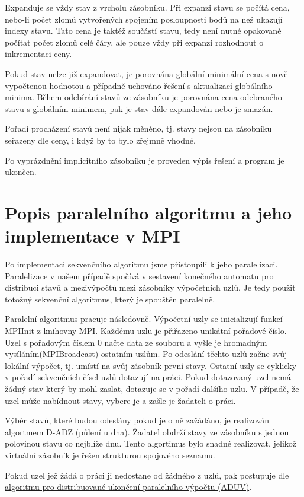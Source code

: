 \documentclass[12pt]{article}
\begin{document}
Expanduje se vždy stav z vrcholu zásobníku. Při expanzi stavu se počítá cena, nebo-li počet zlomů vytvořených spojením posloupnosti bodů na než ukazují indexy stavu. Tato cena je taktéž součástí stavu, tedy není nutné opakovaně počítat počet zlomů celé čáry, ale pouze vždy při expanzi rozhodnout o inkrementaci ceny.

Pokud stav nelze již expandovat, je porovnána globální minimální cena s nově vypočtenou hodnotou a případně uchováno řešení s aktualizací globálního minima. Během odebírání stavů ze zásobníku je porovnána cena odebraného stavu s globálním minimem, pak je stav dále expandován nebo je smazán.

Pořadí procházení stavů není nijak měněno, tj. stavy nejsou na zásobníku seřazeny dle ceny, i když by to bylo zřejmně vhodné.

Po vyprázdnění implicitního zásobníku je proveden výpis řešení a program je ukončen.


\section{Popis paralelního algoritmu a jeho implementace v MPI}

Po implementaci sekvenčního algoritmu jsme přistoupili k jeho paralelizaci. Paralelizace v našem případě spočívá v sestavení  konečného automatu pro distribuci stavů a mezivýpočtů mezi zásobníky výpočetních uzlů. Je tedy použit totožný sekvenční algoritmus, který je spouštěn paralelně.

Paralelní algoritmus pracuje následovně. Výpočetní uzly se inicializují funkcí MPIInit z knihovny MPI. Každému uzlu je přiřazeno unikátní pořadové číslo. Uzel s pořadovým číslem 0 načte data ze souboru a vyšle je hromadným vysíláním(MPIBroadcast) ostatním uzlům. Po odeslání těchto uzlů začne svůj lokální výpočet, tj. umístí na svůj zásobník první stavy. Ostatní uzly se cyklicky v pořadí sekvenčních čísel uzlů dotazují na práci. Pokud dotazovaný uzel nemá žádný stav který by mohl zaslat, dotazuje se v pořadí dalšího uzlu. V případě, že uzel může nabídnout stavy, vybere je a zašle je žadateli o práci. 

Výběr stavů, které budou odeslány pokud je o ně zažádáno, je realizován algortmem D-ADZ (půlení u dna). Žadatel obdrží stavy ze zásobníku s jednou polovinou stavu co nejblíže dnu. Tento algortimus bylo snadné realizovat, jelikož virtuální zásobník je řešen strukturou spojového seznamu.

Pokud uzel jež žádá o práci ji nedostane od žádného z uzlů, pak postupuje dle \href{https://edux.fit.cvut.cz/courses/MI-PAR/labs/prohledavani_do_hloubky#algoritmus_pro_distribuovane_ukonceni_paralelniho_vypoctu_aduv}{algoritmu pro distribuované ukončení paralelního výpočtu (ADUV)}. 
\end{document}
